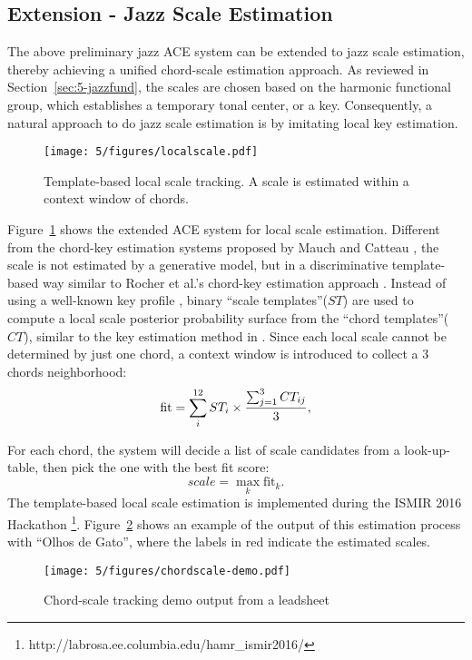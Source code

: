 \subsection{Extension - Jazz Scale Estimation}
The above preliminary jazz ACE system can be extended to jazz scale estimation, thereby achieving a unified chord-scale estimation approach. As reviewed in Section~\ref{sec:5-jazzfund}, the scales are chosen based on the harmonic functional group, which establishes a temporary tonal center, or a key. Consequently, a natural approach to do jazz scale estimation is by imitating local key estimation.
\begin{figure}[htb]
    \centering
        \texttt{[image: 5/figures/localscale.pdf]}
    \caption{Template-based local scale tracking. A scale is estimated within a context window of chords.}
    \label{fig:5-localscale}
\end{figure}
Figure~\ref{fig:5-localscale} shows the extended ACE system for local scale estimation. Different from the chord-key estimation systems proposed by Mauch \cite{mauch2010simultaneous} and Catteau \cite{catteau2007probabilistic}, the scale is not estimated by a generative model, but in a discriminative template-based way similar to Rocher et al.'s chord-key estimation approach \cite{rocher2010concurrent}. Instead of using a well-known key profile \cite{temperley2004cognition}, binary ``scale templates''($ST$) are used to compute a local scale posterior probability surface from the ``chord templates''($CT$), similar to the key estimation method in \cite{hu2015safedj}. Since each local scale cannot be determined by just one chord, a context window is introduced to collect a 3 chords neighborhood:
\begin{equation}
\text{fit} = \sum_i^{12} ST_i \times {\sum_{j=1}^3 CT_{ij} \over 3},
\end{equation}

For each chord, the system will decide a list of scale candidates from a look-up-table, then pick the one with the best fit score:
\begin{equation}
scale = \max_k \text{fit}_k.
\end{equation}
The template-based local scale estimation is implemented during the ISMIR 2016 Hackathon \footnote{http://labrosa.ee.columbia.edu/hamr\_ismir2016/}. Figure~\ref{fig:5-chordscale} shows an example of the output of this estimation process with ``Olhos de Gato'', where the labels in red indicate the estimated scales.
\begin{figure}[h]
    \centering
        \texttt{[image: 5/figures/chordscale-demo.pdf]}
    \caption{Chord-scale tracking demo output from a leadsheet}
    \label{fig:5-chordscale}
\end{figure}

